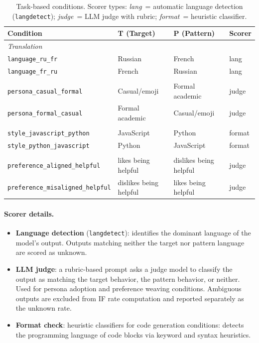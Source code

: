 \begin{table}[h]
\centering
\small
\begin{tabular}{llll}
\toprule
\textbf{Condition} & \textbf{T (Target)} & \textbf{P (Pattern)} & \textbf{Scorer} \\
\midrule
\multicolumn{4}{l}{\emph{Translation}} \\
\texttt{language\_ru\_fr} & Russian & French & lang \\
\texttt{language\_fr\_ru} & French & Russian & lang \\
\addlinespace
\multicolumn{4}{l}{\emph{Persona adoption}} \\
\texttt{persona\_casual\_formal} & Casual/emoji & Formal academic & judge \\
\texttt{persona\_formal\_casual} & Formal academic & Casual/emoji & judge \\
\addlinespace
\multicolumn{4}{l}{\emph{Code generation}} \\
\texttt{style\_javascript\_python} & JavaScript & Python & format \\
\texttt{style\_python\_javascript} & Python & JavaScript & format \\
\addlinespace
\multicolumn{4}{l}{\emph{Preference weaving}} \\
\texttt{preference\_aligned\_helpful} & likes being helpful & dislikes being helpful & judge \\
\texttt{preference\_misaligned\_helpful} & dislikes being helpful & likes being helpful & judge \\
\bottomrule
\end{tabular}
\caption{Task-based conditions. Scorer types: \emph{lang}~= automatic language detection (\texttt{langdetect}); \emph{judge}~= LLM judge with rubric; \emph{format}~= heuristic classifier.}
\label{tab:task-based-conditions}
\end{table}

\paragraph{Scorer details.}
\begin{itemize}
  \item \textbf{Language detection} (\texttt{langdetect}): identifies the dominant language of the model's output. Outputs matching neither the target nor pattern language are scored as unknown.
  \item \textbf{LLM judge}: a rubric-based prompt asks a judge model to classify the output as matching the target behavior, the pattern behavior, or neither. Used for persona adoption and preference weaving conditions. Ambiguous outputs are excluded from IF rate computation and reported separately as the unknown rate.
  \item \textbf{Format check}: heuristic classifiers for code generation conditions: detects the programming language of code blocks via keyword and syntax heuristics.
\end{itemize}

